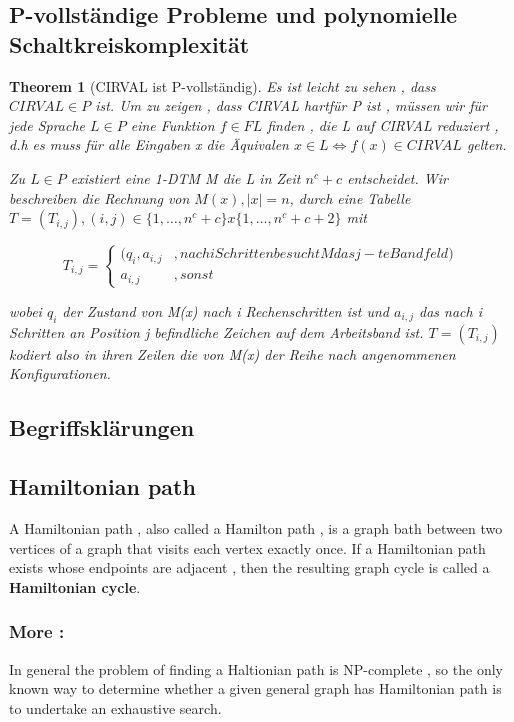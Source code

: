 \documentclass{article}
\newtheorem{theorem}{Theorem}
\begin{document}
	\subsection{P-vollständige Probleme und polynomielle Schaltkreiskomplexität}
		\begin{theorem}[CIRVAL ist P-vollständig]
			Es ist leicht zu sehen , dass $CIRVAL \in P$ ist. Um zu zeigen , dass CIRVAL hartfür P ist , müssen wir für jede Sprache $L \in P$ eine Funktion $f \in FL$ finden , die L auf CIRVAL reduziert , d.h es muss für alle Eingaben x die Äquivalen $x\in L \iff f(x) \in  CIRVAL$ gelten.


			Zu $L \in P$ existiert eine 1-DTM M die L in Zeit $n^c+c$ entscheidet. Wir beschreiben die Rechnung von $M(x) ,  |x| =n $, durch eine Tabelle $T=(T_{i,j}) , (i,j) \in \{ 1, \dots , n^c+c \} x \{ 1 , \dots , n^c+c+2\}$
			mit 

			\[
				T_{i,j} = \begin{cases}
								(q_i , a_{i,j}&, nach i Schritten besucht M das j-te Bandfeld)\\
								a_{i,j} &, sonst
							\end{cases}
			\]

			wobei $q_i$ der Zustand von M(x) nach i Rechenschritten ist und $a_{i,j}$ das nach i Schritten an Position j befindliche Zeichen auf dem Arbeitsband ist. $T = (T_{i,j})$ kodiert also in ihren Zeilen die von M(x) der Reihe nach angenommenen Konfigurationen.

		\end{theorem}

	\begin{appendices}
		\section{Begriffsklärungen}
			\subsection*{Hamiltonian path} \label{hamiltonian_path}
				A Hamiltonian path , also called a Hamilton path , is a graph bath between two vertices of a graph that visits each vertex exactly once. If a Hamiltonian path exists whose endpoints are adjacent , then the resulting graph cycle is called a \textbf{Hamiltonian cycle}.

				\subsubsection*{More :}
					In general the problem of finding a Haltionian path is NP-complete , so the only known way to determine whether a given general graph has Hamiltonian path is to undertake an exhaustive search. 
	\end{appendices}
\end{document}

